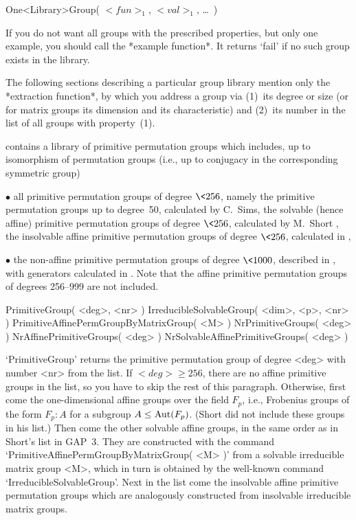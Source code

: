\)\fmark One<Library>Group( $<fun>_1$, $<val>_1$, \dots\ )

If you  do not want  all groups with the  prescribed properties, but only
one example, you should call the *example function*. It returns `fail' if
no such group exists in the library.

The following sections describing a particular group library mention only
the *extraction   function*, by which  you  address a group   via (1)~its
degree  or   size    (or for  matrix   groups  its    dimension  and  its
characteristic) and  (2)~its  number  in  the list  of all   groups  with
property~(1).


{\GAP} contains a library of primitive permutation groups which includes,
up to  isomorphism of permutation groups   (i.e., up to conjugacy  in the
corresponding symmetric group)
\beginlist
  \item{$\bullet$} all  primitive  permutation groups of  degree $\<256$,
    namely
    \itemitem{$\circ$} the primitive permutation groups up to degree~50,
      calculated by C.~Sims,
    \itemitem{$\circ$}  the solvable (hence affine) primitive permutation
      groups of degree $\<256$, calculated by M.~Short \cite{Short92},
    \itemitem{$\circ$} the insolvable affine primitive permutation groups
      of degree $\<256$, calculated in \cite{Theissen97},
  \item{$\bullet$} the  non-affine primitive permutation groups of degree
    $\<1000$,   described    in  \cite{DixonMortimer88},  with generators
    calculated in \cite{Theissen97}.
\endlist
Note that the affine primitive permutation groups of degrees 256--999 are
not included.

\>PrimitiveGroup( <deg>, <nr> )
\>IrreducibleSolvableGroup( <dim>, <p>, <nr> )
\>PrimitiveAffinePermGroupByMatrixGroup( <M> )
\>NrPrimitiveGroups( <deg> )
\>NrAffinePrimitiveGroups( <deg> )
\>NrSolvableAffinePrimitiveGroups( <deg> )

`PrimitiveGroup' returns the primitive permutation  group of degree <deg>
with number <nr>  from the list. If  $<deg>\ge 256$, there  are no affine
primitive  groups in  the list, so   you have to  skip  the rest  of this
paragraph. Otherwise, first  come the one-dimensional affine  groups over
the field $F_p$, i.e., Frobenius groups of the  form $ F_p\mathbin:A$ for
a  subgroup $A\le{\rm Aut}(F_p)$. (Short did  not include these groups in
his list.) Then come the other solvable  affine groups, in the same order
as in Short's list in {\sf GAP~3}. They  are constructed with the command
`PrimitiveAffinePermGroupByMatrixGroup(      <M>  )'   from   a  solvable
irreducible matrix group <M>, which in turn is obtained by the well-known
command `IrreducibleSolvableGroup'. Next  in the list come the insolvable
affine primitive  permutation groups   which are  analogously constructed
from insolvable irreducible matrix groups.

